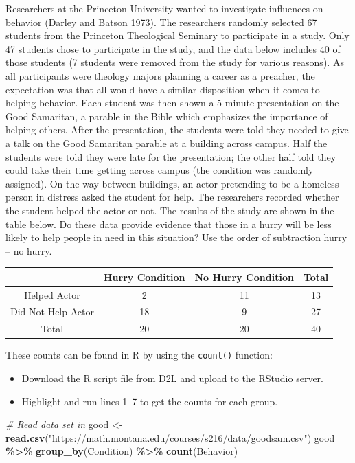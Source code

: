 \documentclass[
]{report}
\newenvironment{Shaded}{\begin{snugshade}}{\end{snugshade}}
\newcommand{\CommentTok}[1]{\textcolor[rgb]{0.56,0.35,0.01}{\textit{#1}}}
\newcommand{\FunctionTok}[1]{\textcolor[rgb]{0.13,0.29,0.53}{\textbf{#1}}}
\newcommand{\NormalTok}[1]{#1}
\newcommand{\OtherTok}[1]{\textcolor[rgb]{0.56,0.35,0.01}{#1}}
\newcommand{\SpecialCharTok}[1]{\textcolor[rgb]{0.81,0.36,0.00}{\textbf{#1}}}
\newcommand{\StringTok}[1]{\textcolor[rgb]{0.31,0.60,0.02}{#1}}
\begin{document}
Researchers at the Princeton University wanted to investigate influences on behavior (Darley and Batson 1973). The researchers randomly selected 67 students from the Princeton Theological Seminary to participate in a study. Only 47 students chose to participate in the study, and the data below includes 40 of those students (7 students were removed from the study for various reasons). As all participants were theology majors planning a career as a preacher, the expectation was that all would have a similar disposition when it comes to helping behavior. Each student was then shown a 5-minute presentation on the Good Samaritan, a parable in the Bible which emphasizes the importance of helping others. After the presentation, the students were told they needed to give a talk on the Good Samaritan parable at a building across campus. Half the students were told they were late for the presentation; the other half told they could take their time getting across campus (the condition was randomly assigned). On the way between buildings, an actor pretending to be a homeless person in distress asked the student for help. The researchers recorded whether the student helped the actor or not. The results of the study are shown in the table below. Do these data provide evidence that those in a hurry will be less likely to help people in need in this situation? Use the order of subtraction hurry -- no hurry.

\begin{center}
\begin{tabular}{|c|c|c|c|}\hline
& Hurry Condition & No Hurry Condition & Total \\ \hline
Helped Actor & 2 & 11 & 13 \\ \hline
Did Not Help Actor & 18 & 9 & 27 \\ \hline
Total & 20 & 20 & 40 \\ \hline
\end{tabular}
\end{center}

These counts can be found in R by using the \texttt{count()} function:

\begin{itemize}
\item
  Download the R script file from D2L and upload to the RStudio server.
\item
  Highlight and run lines 1--7 to get the counts for each group.
\end{itemize}

\begin{Shaded}
\begin{Highlighting}[]
\CommentTok{\# Read data set in}
\NormalTok{good }\OtherTok{\textless{}{-}} \FunctionTok{read.csv}\NormalTok{(}\StringTok{"https://math.montana.edu/courses/s216/data/goodsam.csv"}\NormalTok{) }
\NormalTok{good }\SpecialCharTok{\%\textgreater{}\%} \FunctionTok{group\_by}\NormalTok{(Condition) }\SpecialCharTok{\%\textgreater{}\%} \FunctionTok{count}\NormalTok{(Behavior)}
\end{Highlighting}
\end{Shaded}
\end{document}
